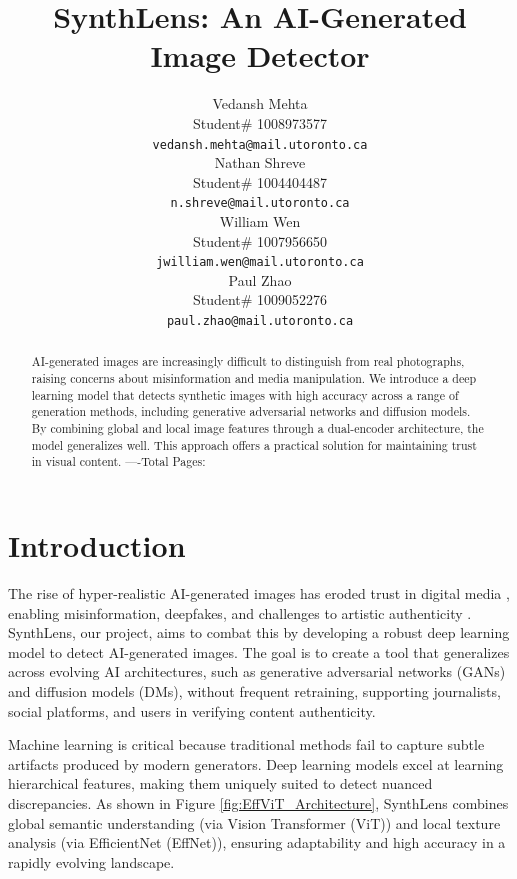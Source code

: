 \documentclass{article} %
\title{SynthLens: An AI-Generated Image Detector}
\author{Vedansh Mehta  \\
Student\# 1008973577 \\
\texttt{vedansh.mehta@mail.utoronto.ca} \\
\And
Nathan Shreve  \\
Student\# 1004404487 \\
\texttt{n.shreve@mail.utoronto.ca} \\
\AND
William Wen  \\
Student\# 1007956650 \\
\texttt{jwilliam.wen@mail.utoronto.ca} \\
\And
Paul Zhao \\
Student\# 1009052276 \\
\texttt{paul.zhao@mail.utoronto.ca} \\
\AND
}
\begin{document}
\maketitle

\begin{abstract}
    AI-generated images are increasingly difficult to distinguish from real photographs, raising concerns about misinformation and media manipulation. We introduce a deep learning model that detects synthetic images with high accuracy across a range of generation methods, including generative adversarial networks and diffusion models. By combining global and local image features through a dual-encoder architecture, the model generalizes well. This approach offers a practical solution for maintaining trust in visual content.
    ----Total Pages: \pageref{last_page}
\end{abstract}



\section{Introduction}
The rise of hyper-realistic AI-generated images has eroded trust in digital media \citep{digitalcontent2024trust}, enabling misinformation, deepfakes, and challenges to artistic authenticity \citep{Guardian2023}. SynthLens, our project, aims to combat this by developing a robust deep learning model to detect AI-generated images. The goal is to create a tool that generalizes across evolving AI architectures, such as generative adversarial networks (GANs) and diffusion models (DMs), without frequent retraining, supporting journalists, social platforms, and users in verifying content authenticity.

Machine learning is critical because traditional methods fail to capture subtle artifacts produced by modern generators. Deep learning models excel at learning hierarchical features, making them uniquely suited to detect nuanced discrepancies. As shown in Figure \ref{fig:EffViT_Architecture}, SynthLens combines global semantic understanding (via Vision Transformer (ViT)) and local texture analysis (via EfficientNet (EffNet)), ensuring adaptability and high accuracy in a rapidly evolving landscape.
\end{document}
